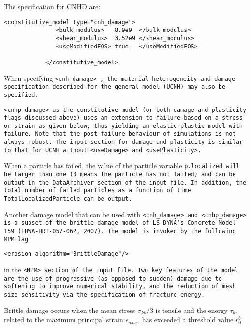 \begin{enumerate}
The specification for CNHD are:

\begin{Verbatim}[fontsize=\footnotesize]
            <constitutive_model type="cnh_damage"> 
               <bulk_modulus>   8.9e9  </bulk_modulus>
               <shear_modulus>  3.52e9 </shear_modulus>
               <useModifiedEOS> true   </useModifiedEOS>
                
            </constitutive_model>
\end{Verbatim}

When specifying \tt <cnh\_damage> \normalfont, the material heterogeneity and damage 
specification described for the general model (UCNH) may also be specified.

\tt <cnhp\_damage> \normalfont as the constitutive model (or both damage and plasticity
 flags discussed above) uses an extension
to failure based on a stress or strain as given below, thus yielding an
elastic-plastic model with failure.  Note that the post-failure behaviour of
simulations is not always robust.  The input section for damage and plasticity is
similar to that for UCNH without \tt <useDamage> \normalfont and \tt <usePlasticity>. \normalfont

When a particle has failed, the value of the particle variable \tt p.localized \normalfont
will be larger than one (0 means the particle has not failed) and can be output in the \tt DataArchiver
\normalfont section of the input file. In addition, the total number of failed particles as
a function of time \tt TotalLocalizedParticle \normalfont can be output. 

Another damage model that can be used with \tt <cnh\_damage> \normalfont and
\tt <cnhp\_damage> \normalfont is a subset of the brittle damage model of LS-DYNA's Concrete
 Model 159 (FHWA-HRT-057-062, 2007). The model is invoked by the following MPMFlag
\begin{Verbatim}[fontsize=\footnotesize]
     <erosion algorithm="BrittleDamage"/>
\end{Verbatim}
in the \tt <MPM> \normalfont section of the input file. Two key features of the model are the use of
progressive (as opposed to sudden) damage due to softening to improve numerical stability, 
and the reduction of mesh size sensitivity via the specification of fracture energy. 

Brittle damage occurs when the mean stress $\sigma_{kk}/3$ is tensile
and the energy $\tau_b$, related to the maximum principal 
strain $\epsilon_{max}$, has exceeded a threshold value $r_0^b$


\end{enumerate}
